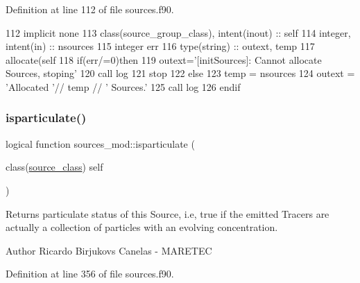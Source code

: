 Definition at line 112 of file sources.\+f90.


\begin{DoxyCode}
112     \textcolor{keywordtype}{implicit none}
113     \textcolor{keywordtype}{class}(source\_group\_class), \textcolor{keywordtype}{intent(inout)} :: self
114     \textcolor{keywordtype}{integer}, \textcolor{keywordtype}{intent(in)} :: nsources
115     \textcolor{keywordtype}{integer} err
116     \textcolor{keywordtype}{type}(string) :: outext, temp
117     \textcolor{keyword}{allocate}(self%
118     \textcolor{keywordflow}{if}(err/=0)\textcolor{keywordflow}{then}
119         outext=\textcolor{stringliteral}{'[initSources]: Cannot allocate Sources, stoping'}
120         \textcolor{keyword}{call }log%
121         stop
122     \textcolor{keywordflow}{else}
123         temp = nsources
124         outext = \textcolor{stringliteral}{'Allocated '}// temp // \textcolor{stringliteral}{' Sources.'}
125         \textcolor{keyword}{call }log%
126 \textcolor{keywordflow}{    endif}
\end{DoxyCode}
\mbox{\label{namespacesources__mod_ac4e4f33da78d030e1b56a48789da6a05}} 
\subsubsection{\texorpdfstring{isparticulate()}{isparticulate()}}
{\footnotesize\ttfamily logical function sources\+\_\+mod\+::isparticulate (\begin{DoxyParamCaption}\item[{class(\mbox{\hyperlink{structsources__mod_1_1source__class}{source\+\_\+class}})}]{self }\end{DoxyParamCaption})\hspace{0.3cm}{\ttfamily [private]}}



Returns particulate status of this Source, i.\+e, true if the emitted Tracers are actually a collection of particles with an evolving concentration. 

\begin{DoxyAuthor}{Author}
Ricardo Birjukovs Canelas -\/ M\+A\+R\+E\+T\+EC 
\end{DoxyAuthor}


Definition at line 356 of file sources.\+f90.


